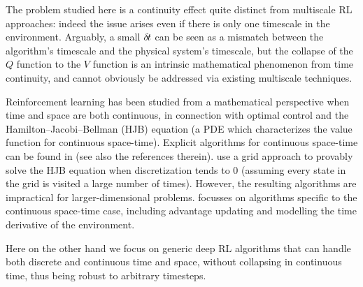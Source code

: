 
The problem studied here is a continuity effect quite distinct from
multiscale RL approaches: indeed the issue arises even if there
is only one timescale in the environment. Arguably, a small
${\delta\hspace{-.1em}t}$ can be seen as a mismatch between the algorithm's
timescale and the physical system's timescale, but the collapse of the
$Q$ function to the $V$ function is an intrinsic mathematical phenomenon  from time
continuity, and cannot obviously be addressed via existing multiscale
techniques. 

Reinforcement learning has been studied from a mathematical perspective
when time and space are both continuous, in connection with optimal
control and the Hamilton--Jacobi--Bellman (HJB) equation (a PDE which
characterizes the value function for continuous space-time). Explicit
algorithms for continuous
space-time can be found in
\cite{cont_rl,MunosBourgines98} (see also the references therein).
\cite{MunosBourgines98} use a grid approach to provably solve the HJB
equation when discretization tends to $0$ (assuming every state in the
grid is visited a large number of times). However,
the resulting algorithms are
impractical \cite{cont_rl} for larger-dimensional problems.
\cite{cont_rl} focusses on algorithms specific to the continuous
space-time case, including advantage updating and modelling
the time derivative of the environment.

Here on the other hand we focus on generic deep RL algorithms that can handle
both discrete and continuous time and space, without collapsing in
continuous time, thus being robust to arbitrary timesteps.


